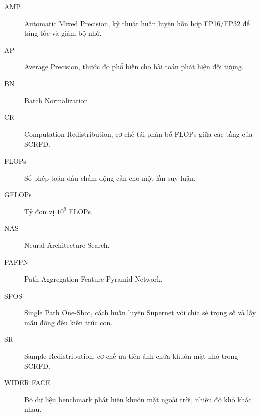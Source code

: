 \begin{description}
  \item[AMP] Automatic Mixed Precision, kỹ thuật huấn luyện hỗn hợp FP16/FP32 để tăng tốc và giảm bộ nhớ.
  \item[AP] Average Precision, thước đo phổ biến cho bài toán phát hiện đối tượng.
  \item[BN] Batch Normalization.
  \item[CR] Computation Redistribution, cơ chế tái phân bổ FLOPs giữa các tầng của SCRFD.
  \item[FLOPs] Số phép toán dấu chấm động cần cho một lần suy luận.
  \item[GFLOPs] Tỷ đơn vị \(10^9\) FLOPs.
  \item[NAS] Neural Architecture Search.
  \item[PAFPN] Path Aggregation Feature Pyramid Network.
  \item[SPOS] Single Path One-Shot, cách huấn luyện Supernet với chia sẻ trọng số và lấy mẫu đồng đều kiến trúc con. \cite{guo2020spos}
  \item[SR] Sample Redistribution, cơ chế ưu tiên ảnh chứa khuôn mặt nhỏ trong SCRFD.
  \item[WIDER FACE] Bộ dữ liệu benchmark phát hiện khuôn mặt ngoài trời, nhiều độ khó khác nhau. \cite{yang2016widerface}
\end{description}
